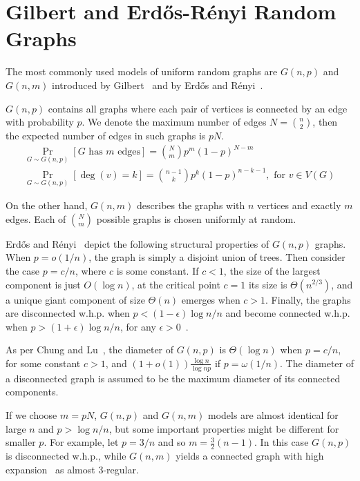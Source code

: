 \section{Gilbert and \texorpdfstring{Erd\H{o}s-R\'enyi}{Erdos-Renyi} Random Graphs}

The most commonly used models of uniform random graphs are $G(n,p)$ and $G(n,m)$
introduced by Gilbert~\cite{gil59} and by Erd\H{o}s and R\'enyi~\cite{er59}.

$G(n,p)$ contains all graphs where each pair of vertices
is connected by an edge with probability $p$.
We denote the maximum number of edges $N=\binom{n}{2}$,
then the expected number of edges in such graphs is $pN$.
\begin{gather}
    \Pr_{G\sim G(n,p)}[G\text{ has }m\text{ edges}]=\binom{N}{m}p^m(1-p)^{N-m}\\
    \Pr_{G\sim G(n,p)}[\deg(v)=k]=\binom{n-1}{k}p^k(1-p)^{n-k-1},\text{ for }v\in V(G)
\end{gather}

On the other hand, $G(n,m)$ describes the graphs with $n$ vertices and exactly $m$ edges.
Each of $\binom{N}{m}$ possible graphs is chosen uniformly at random.

Erd\H{o}s and R\'enyi~\cite{er60} depict the following structural properties of $G(n,p)$ graphs.
When $p=o(1/n)$, the graph is simply a disjoint union of trees.
Then consider the case $p=c/n$, where $c$ is some constant.
If $c<1$, the size of the largest component is just $O(\log n)$,
at the critical point $c=1$ its size is $\Theta\left(n^{2/3}\right)$,
and a unique giant component of size $\Theta(n)$ emerges when $c>1$.
Finally, the graphs are disconnected  w.h.p. when $p<(1-\epsilon)\log n/n$
and become connected w.h.p. when $p>(1+\epsilon)\log n/n$, for any $\epsilon>0$~\cite{er59}.

As per Chung and Lu~\cite{cl01,cl04}, the diameter of $G(n,p)$ is
$\Theta(\log n)$ when $p=c/n$, for some constant $c>1$,
and $(1+o(1))\frac{\log n}{\log np}$ if $p=\omega(1/n)$.
The diameter of a disconnected graph is assumed to be the maximum
diameter of its connected components.


If we choose $m=pN$, $G(n,p)$ and $G(n,m)$ models are almost identical for large $n$
and $p>\log n/n$, but some important properties might be different for smaller $p$.
For example, let $p=3/n$ and so $m=\frac{3}{2}(n-1)$.
In this case $G(n,p)$ is disconnected w.h.p., while $G(n,m)$ yields
a connected graph with high expansion~\cite{mah09} as almost 3-regular.

